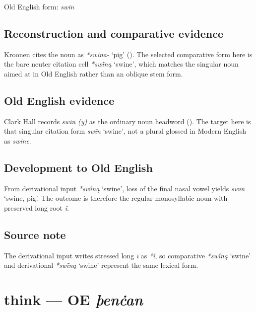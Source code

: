 \documentclass[
  british,
  a4paper,
  openany]{book}
\providecommand{\Recon}[1]{\emph{*#1}}
{\catcode`→=\active \global\def→{\ensuremath{\rightarrow}}}
\providecommand{\texorpdfstring}[2]{#1}
\providecommand{\Recon}[1]{\emph{*#1}}
{\catcode`→=\active \global\def→{\ensuremath{\rightarrow}}}
\begin{document}
Old English form: \emph{swīn}

\subsection{Reconstruction and comparative
evidence}\label{reconstruction-and-comparative-evidence-54}

Kroonen cites the noun as \emph{*swina-} `pig'
(). The selected comparative
form here is the bare neuter citation cell \Recon{swī́ną} `swine', which
matches the singular noun aimed at in Old English rather than an oblique
stem form.

\subsection{Old English evidence}\label{old-english-evidence-54}

Clark Hall records \emph{swin (y)} as the ordinary noun headword
(). The target here is that
singular citation form \emph{swīn} `swine', not a plural glossed in
Modern English as \emph{swine}.

\subsection{Development to Old
English}\label{development-to-old-english-54}

From derivational input \Recon{swī́ną} `swine', loss of the final nasal
vowel yields {\emph{swīn}} `swine, pig'. The outcome is therefore the
regular monosyllabic noun with preserved long root \emph{ī}.

\subsection{Source note}\label{source-note-4}

The derivational input writes stressed long \emph{ī} as \emph{*ī́}, so
comparative \Recon{swī́ną} `swine' and derivational \Recon{swī́ną} `swine'
represent the same lexical form.

\section{\texorpdfstring{think --- OE
\emph{þenċan}}{think --- OE þenċan}}\label{think-oe-uxfeenux10ban}

\end{document}
